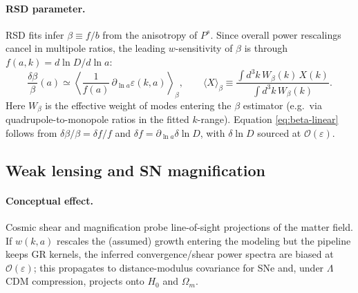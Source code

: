 \documentclass[11pt]{article}
\begin{document}
\paragraph{RSD parameter.}
RSD fits infer $\beta\equiv f/b$ from the anisotropy of $P^s$. Since overall power rescalings cancel in multipole ratios, the leading $w$-sensitivity of $\beta$ is through $f(a,k)=d\ln D/d\ln a$:
\begin{equation}
\label{eq:beta-linear}
\frac{\delta\beta}{\beta}(a)\simeq\left\langle\frac{1}{f(a)}\,
\partial_{\ln a}\varepsilon(k,a)\right\rangle_{\!\beta},
\qquad
\langle X\rangle_{\!\beta}\equiv
\frac{\displaystyle \int d^3k\,W_{\beta}(k)\,X(k)}
{\displaystyle \int d^3k\,W_{\beta}(k)}.
\end{equation}
Here $W_{\beta}$ is the effective weight of modes entering the $\beta$ estimator (e.g.\ via quadrupole-to-monopole ratios in the fitted $k$-range). Equation \eqref{eq:beta-linear} follows from $\delta\beta/\beta=\delta f/f$ and $\delta f=\partial_{\ln a}\delta\ln D$, with $\delta\ln D$ sourced at $\mathcal{O}(\varepsilon)$.

\subsection{Weak lensing and SN magnification}
\label{subsec:lensing-sn}

\paragraph{Conceptual effect.}
Cosmic shear and magnification probe line-of-sight projections of the matter field. If $w(k,a)$ rescales the (assumed) growth entering the modeling but the pipeline keeps GR kernels, the inferred convergence/shear power spectra are biased at $\mathcal{O}(\varepsilon)$; this propagates to distance-modulus covariance for SNe and, under $\Lambda$CDM compression, projects onto $H_0$ and $\Omega_m$.
\end{document}
